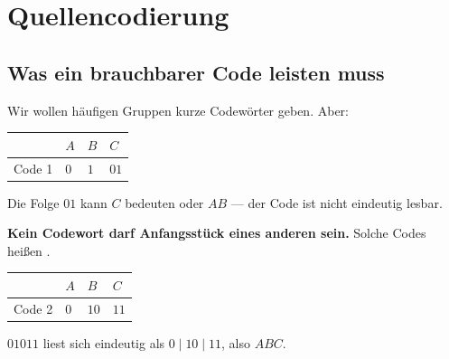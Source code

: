 \chapter{Quellencodierung}

\section{Was ein brauchbarer Code leisten muss}

\begin{merksatz}
Wir wollen häufigen Gruppen kurze Codewörter geben. Aber:

\begin{center}
{\small
\renewcommand{\arraystretch}{1.48}
\begin{tabular}{@{}P{1.8cm}P{1.8cm}P{1.8cm}P{1.8cm}@{}}
\toprule
& $A$ & $B$ & $C$\\
\midrule
Code 1 & $0$ & $1$ & $01$\\
\bottomrule
\end{tabular}}
\end{center}

Die Folge $01$ kann $C$ bedeuten oder $AB$ --- der Code ist nicht eindeutig lesbar.

\begin{center}
\begin{minipage}{0.9\textwidth}
\textbf{Kein Codewort darf Anfangsstück eines anderen sein.} Solche Codes heißen .
\end{minipage}
\end{center}

\begin{center}
{\small
\renewcommand{\arraystretch}{1.48}
\begin{tabular}{@{}P{1.8cm}P{1.8cm}P{1.8cm}P{1.8cm}@{}}
\toprule
& $A$ & $B$ & $C$\\
\midrule
Code 2 & $0$ & $10$ & $11$\\
\bottomrule
\end{tabular}}
\end{center}

 $01011$ liest sich eindeutig als $0\mid10\mid11$, also $ABC$.

\begin{center}
\begin{minipage}{0.88\textwidth}
\end{minipage}
\end{center}
\end{merksatz}

